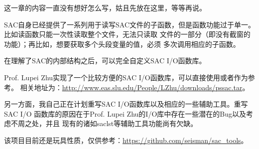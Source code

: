 这一章的内容一直没有想好怎么写，姑且先放在这里，等等再说。

SAC自身已经提供了一系列用于读写SAC文件的子函数，但是函数功能过于单一。
比如读函数只能一次性读取整个文件，无法只读取
文件的一部分（即没有截窗的功能）；再比如，想要获取多个头段变量的值，必须
多次调用相应的子函数。

在理解了SAC的内部结构之后，可以完全自定义SAC I/O函数库。

Prof. Lupei Zhu实现了一个比较方便的SAC I/O函数库，可以直接使用或者作为参考。
相关地址为：\url{http://www.eas.slu.edu/People/LZhu/downloads/pssac.tar}。

另一方面，我自己正在计划重写SAC I/O函数库以及相应的一些辅助工具。重写SAC I/O
函数库的原因在于Prof. Lupei Zhu的I/O库中存在一些潜在的Bug以及考虑不周之处，并且
现有的诸如saclst等辅助工具功能尚有欠缺。

该项目目前还是玩具性质，仅供参考：\url{https://github.com/seisman/sac_tools}。

